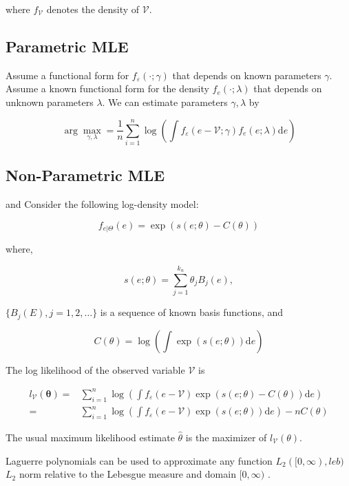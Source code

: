 \documentclass[
  12pt]{article}
\theoremstyle{definition}
\theoremstyle{remark}
\begin{document}
where \(f_{\mathcal{V}}\) denotes the density of \(\mathcal{V}\).

\subsection{Parametric MLE}\label{parametric-mle}

\citet{Chen2007} \citet{Yi2021} Assume a functional form for
\(f_{\varepsilon}(\cdot;\gamma)\) that depends on known parameters
\(\gamma\). Assume a known functional form for the density
\(f_e(\cdot;\lambda)\) that depends on unknown parameters \(\lambda\).
We can estimate parameters \(\gamma, \lambda\) by

\[
\arg \max_{\gamma,\lambda}=\frac{1}{n}\sum_{i=1}^n \log \left(\int f_{\varepsilon}(e-\mathcal{V};\gamma)f_e(e;\lambda)\text{d}e\right)
\]

\subsection{Non-Parametric MLE}\label{non-parametric-mle}

\citet{Chen2007} and \citet{Kang2021} Consider the following log-density
model:

\[
f_{e|\Theta}(e)=\exp(s(e;\theta)-C(\theta))
\]

where,

\[
s(e;\theta)=\sum_{j=1}^{k_n}\theta_j B_j(e),
\]

\(\{B_j(E), j=1,2,\dots\}\) is a sequence of known basis functions, and

\[
C(\theta) = \log\left(\int \exp(s(e;\theta)) \text{d}e \right)
\]

The log likelihood of the observed variable \(\mathcal{V}\) is

\[
\begin{aligned}
    l_{\mathcal{V}}(\mathbf{\theta})=&\sum_{i=1}^{n}\log \left(\int f_{\varepsilon}(e-\mathcal{V})\exp(s(e;\theta)-C(\theta))\text{d}e\right)\\
    =&\sum_{i=1}^{n}\log \left(\int f_{\varepsilon}(e-\mathcal{V})\exp(s(e;\theta))\text{d}e\right)-nC(\theta)
\end{aligned}
\]

The usual maximum likelihood estimate \(\hat{\theta}\) is the maximizer
of \(l_{\mathcal{V}}(\theta)\).

Laguerre polynomials can be used to approximate any function
\(L_2([0,\infty), leb)\) \(L_2\) norm relative to the Lebesgue measure
and domain \([0,\infty)\) \citep{Chen2007}.
\end{document}
